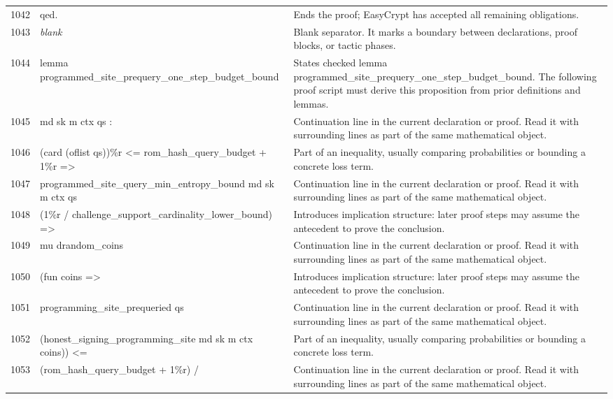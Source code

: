\documentclass[10pt]{article}
\begin{document}
\begin{longtable}{r L{0.53\textwidth} L{0.37\textwidth}}
1042 & {\ttfamily\scriptsize qed.} & Ends the proof; EasyCrypt has accepted all remaining obligations. \\
1043 & {\ttfamily\scriptsize \emph{blank}} & Blank separator.  It marks a boundary between declarations, proof blocks, or tactic phases. \\
1044 & {\ttfamily\scriptsize lemma programmed\_site\_prequery\_one\_step\_budget\_bound} & States checked lemma programmed\_site\_prequery\_one\_step\_budget\_bound.  The following proof script must derive this proposition from prior definitions and lemmas. \\
1045 & {\ttfamily\scriptsize   md sk m ctx qs :} & Continuation line in the current declaration or proof.  Read it with surrounding lines as part of the same mathematical object. \\
1046 & {\ttfamily\scriptsize   (card (oflist qs))\%r <= rom\_hash\_query\_budget + 1\%r =>} & Part of an inequality, usually comparing probabilities or bounding a concrete loss term. \\
1047 & {\ttfamily\scriptsize   programmed\_site\_query\_min\_entropy\_bound md sk m ctx qs} & Continuation line in the current declaration or proof.  Read it with surrounding lines as part of the same mathematical object. \\
1048 & {\ttfamily\scriptsize     (1\%r / challenge\_support\_cardinality\_lower\_bound) =>} & Introduces implication structure: later proof steps may assume the antecedent to prove the conclusion. \\
1049 & {\ttfamily\scriptsize   mu drandom\_coins} & Continuation line in the current declaration or proof.  Read it with surrounding lines as part of the same mathematical object. \\
1050 & {\ttfamily\scriptsize     (fun coins =>} & Introduces implication structure: later proof steps may assume the antecedent to prove the conclusion. \\
1051 & {\ttfamily\scriptsize       programming\_site\_prequeried qs} & Continuation line in the current declaration or proof.  Read it with surrounding lines as part of the same mathematical object. \\
1052 & {\ttfamily\scriptsize         (honest\_signing\_programming\_site md sk m ctx coins)) <=} & Part of an inequality, usually comparing probabilities or bounding a concrete loss term. \\
1053 & {\ttfamily\scriptsize   (rom\_hash\_query\_budget + 1\%r) /} & Continuation line in the current declaration or proof.  Read it with surrounding lines as part of the same mathematical object. \\

\end{longtable}
\end{document}

